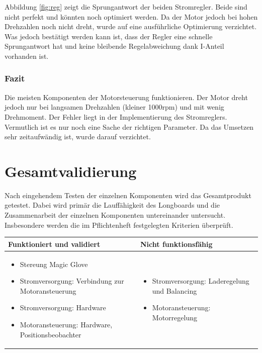 Abbildung \ref{fig:reg} zeigt die Sprungantwort der beiden Stromregler. Beide sind nicht perfekt und könnten noch optimiert werden. Da der Motor jedoch bei hohen Drehzahlen noch nicht dreht, wurde auf eine ausführliche Optimierung verzichtet. Was jedoch bestätigt werden kann ist, dass der Regler eine schnelle Sprungantwort hat und keine bleibende Regelabweichung dank I-Anteil vorhanden ist.


\subsubsection*{Fazit}
Die meisten Komponenten der Motorsteuerung funktionieren. Der Motor dreht jedoch nur bei langsamen Drehzahlen (kleiner 1000rpm) und mit wenig Drehmoment. Der Fehler liegt in der Implementierung des Stromreglers. Vermutlich ist es nur noch eine Sache der richtigen Parameter. Da das Umsetzen sehr zeitaufwändig ist, wurde darauf verzichtet.


\section{Gesamtvalidierung} \label{ValidGesamtv}
Nach eingehendem Testen der einzelnen Komponenten wird das Gesamtprodukt getestet. Dabei wird primär die Lauffähigkeit des Longboards und die Zusammenarbeit der einzelnen Komponenten untereinander untersucht. Insbesondere werden die im Pflichtenheft festgelegten Kriterien überprüft.

\begin{center}
	\begin{tabular}{p{}|p{}}
		Funktioniert und validiert & Nicht funktionsfähig \\ \hline 
		\begin{itemize}
			\item Stereung Magic Glove
			\item Stromversorgung: Verbindung zur Motoransteuerung
			\item Stromversorgung: Hardware
			\item Motoransteuerung: Hardware, Positionsbeobachter
		\end{itemize}
		&
		\begin{itemize}
			\item Stromversorgung: Laderegelung und Balancing
			\item Motoransteuerung: Motorregelung
		\end{itemize}
		\\ \hline
	\end{tabular} 
	\label{tab:sumblk}
\end{center}

